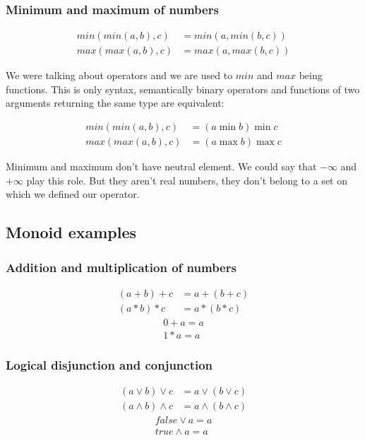 \documentclass{article}
\begin{document}
    \subsubsection{Minimum and maximum of numbers}

    \begin{align*}
        min(min(a, b), c) &= min(a, min(b, c)) \\
        max(max(a, b), c) &= max(a, max(b, c))
    \end{align*}

    We were talking about operators and we are used to $min$ and $max$ being functions. 
    This is only syntax, semantically binary operators and functions of two arguments returning the same type are equivalent:

    \begin{align*}
        min(min(a, b), c) &= (a \min b) \min c \\ 
        max(max(a, b), c) &= (a \max b) \max c 
    \end{align*}

    Minimum and maximum don't have neutral element. 
    We could say that $-\infty$ and $+\infty$ play this role. 
    But they aren't real numbers, they don't belong to a set on which we defined our operator.

    \subsection{Monoid examples}

    \subsubsection{Addition and multiplication of numbers}

    \begin{align*}
        (a + b) + c &= a + (b + c) \\
        (a * b) * c &= a * (b * c)
    \end{align*}
    \begin{align*}
        0 + a = a \\
        1 * a = a  
    \end{align*}

    \subsubsection{Logical disjunction and conjunction}

    \begin{align*}
        (a \vee   b) \vee   c &= a \vee   (b \vee   c) \\
        (a \wedge b) \wedge c &= a \wedge (b \wedge c)
    \end{align*}
    \begin{align*}
        false \vee   a = a \\
        true  \wedge a = a 
    \end{align*}
\end{document}
